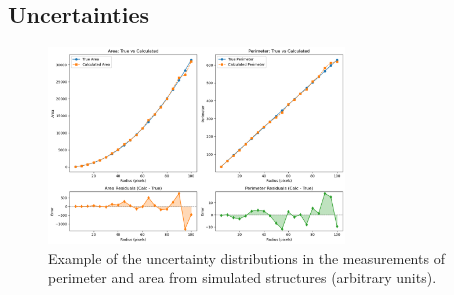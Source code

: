 \subsection{Uncertainties}

\begin{figure}[h]
    \centering
    \includegraphics[width=0.7\textwidth]{figures/perimeter_area_uncertainties.png}
    \caption{Example of the uncertainty distributions in the measurements of perimeter and area from simulated structures (arbitrary units).}
    \label{fig:uncertainties}
\end{figure}

